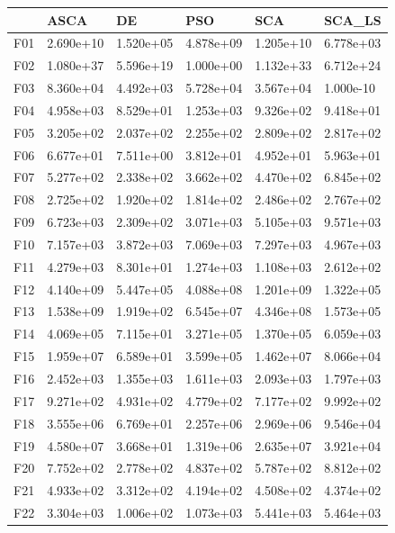 \begin{tabular}{llllll}
\toprule
{} &       ASCA &         DE &        PSO &        SCA &     SCA\_LS \\
\midrule
F01  &  2.690e+10 &  1.520e+05 &  4.878e+09 &  1.205e+10 &  6.778e+03 \\
F02  &  1.080e+37 &  5.596e+19 &  1.000e+00 &  1.132e+33 &  6.712e+24 \\
F03  &  8.360e+04 &  4.492e+03 &  5.728e+04 &  3.567e+04 &  1.000e-10 \\
F04  &  4.958e+03 &  8.529e+01 &  1.253e+03 &  9.326e+02 &  9.418e+01 \\
F05  &  3.205e+02 &  2.037e+02 &  2.255e+02 &  2.809e+02 &  2.817e+02 \\
F06  &  6.677e+01 &  7.511e+00 &  3.812e+01 &  4.952e+01 &  5.963e+01 \\
F07  &  5.277e+02 &  2.338e+02 &  3.662e+02 &  4.470e+02 &  6.845e+02 \\
F08  &  2.725e+02 &  1.920e+02 &  1.814e+02 &  2.486e+02 &  2.767e+02 \\
F09  &  6.723e+03 &  2.309e+02 &  3.071e+03 &  5.105e+03 &  9.571e+03 \\
F10  &  7.157e+03 &  3.872e+03 &  7.069e+03 &  7.297e+03 &  4.967e+03 \\
F11  &  4.279e+03 &  8.301e+01 &  1.274e+03 &  1.108e+03 &  2.612e+02 \\
F12  &  4.140e+09 &  5.447e+05 &  4.088e+08 &  1.201e+09 &  1.322e+05 \\
F13  &  1.538e+09 &  1.919e+02 &  6.545e+07 &  4.346e+08 &  1.573e+05 \\
F14  &  4.069e+05 &  7.115e+01 &  3.271e+05 &  1.370e+05 &  6.059e+03 \\
F15  &  1.959e+07 &  6.589e+01 &  3.599e+05 &  1.462e+07 &  8.066e+04 \\
F16  &  2.452e+03 &  1.355e+03 &  1.611e+03 &  2.093e+03 &  1.797e+03 \\
F17  &  9.271e+02 &  4.931e+02 &  4.779e+02 &  7.177e+02 &  9.992e+02 \\
F18  &  3.555e+06 &  6.769e+01 &  2.257e+06 &  2.969e+06 &  9.546e+04 \\
F19  &  4.580e+07 &  3.668e+01 &  1.319e+06 &  2.635e+07 &  3.921e+04 \\
F20  &  7.752e+02 &  2.778e+02 &  4.837e+02 &  5.787e+02 &  8.812e+02 \\
F21  &  4.933e+02 &  3.312e+02 &  4.194e+02 &  4.508e+02 &  4.374e+02 \\
F22  &  3.304e+03 &  1.006e+02 &  1.073e+03 &  5.441e+03 &  5.464e+03 \\

\end{tabular}
